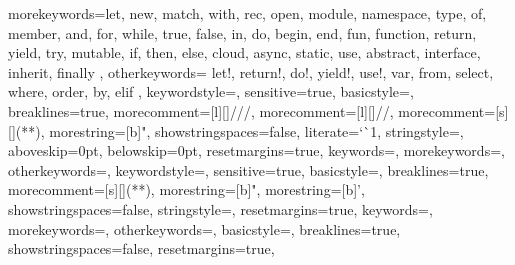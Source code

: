 %
{morekeywords={let, new, match, with, rec, open, module, namespace, type, of, member, %
and, for, while, true, false, in, do, begin, end, fun, function, return, yield, try, %
mutable, if, then, else, cloud, async, static, use, abstract, interface, inherit, finally },
  otherkeywords={ let!, return!, do!, yield!, use!, var, from, select,
    where, order, by, elif },
  keywordstyle=\color{keywordsColor},
  sensitive=true,
  basicstyle=\ttfamily,
	breaklines=true,
  morecomment=[l][\color{commentsColor}]{///},
  morecomment=[l][\color{commentsColor}]{//},
  morecomment=[s][\color{commentsColor}]{{(*}{*)}},
  morestring=[b]",
  showstringspaces=false,
  literate={`}{\`}1,
  stringstyle=\color{stringsColor},
  aboveskip=0pt, 
  belowskip=0pt,
  resetmargins=true,
}
%
{keywords={},
  morekeywords={},
  otherkeywords={},
  keywordstyle=\color{keywordsColor},
  sensitive=true,
  basicstyle=\ttfamily, breaklines=true,
  morecomment=[s][\color{commentsColor}]{{(*}{*)}},
  morestring=[b]",
  morestring=[b]',
  showstringspaces=false,
  stringstyle=\color{stringsColor},
  resetmargins=true,
}
%
{keywords={},
  morekeywords={},
  otherkeywords={},
  basicstyle=\ttfamily, breaklines=true,
  showstringspaces=false,
  resetmargins=true,
}
\lstset{language=console}

\usepackage{verbdef}
\verbdef{\cmdl}{>}


\newcommand{\fs}[2]{
  \begin{mdframed}[frametitle=#1.fsx,frametitlerulewidth=0.4pt,frametitlerule=true]
      
      \noindent\makebox[\linewidth]{\rule{\linewidth}{0.4pt}}
      \cmdl\texttt{ fsharpi #1.fsx}
      
  \end{mdframed}
}
\newcommand{\fse}[2]{
  \begin{mdframed}[frametitle=#1.fsx,frametitlerulewidth=0.4pt,frametitlerule=true]
    \begin{minipage}{1\linewidth}
      
    \end{minipage}
  \end{mdframed}
}

\newcommand{\advice}[1]{#1\marginpar{Advice!}}
\newcommand{\advanced}[1]{#1\marginpar{Advanced material}}

\newcommand{\jon}[1]{\marginpar{#1}}


